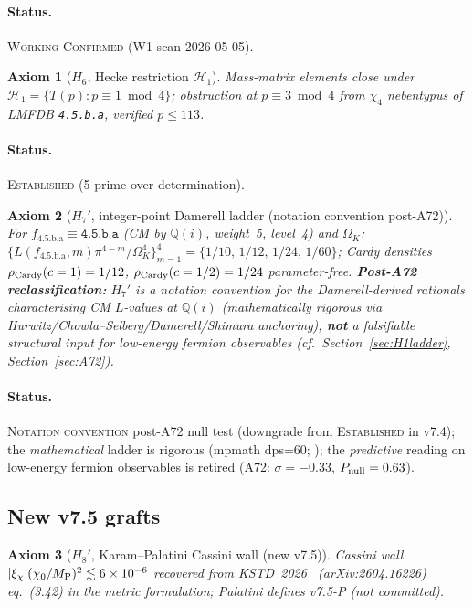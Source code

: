 \documentclass[a4paper,11pt]{article}
\newcommand{\OmK}{\Omega_K}
\newcommand{\fLM}{f_{\text{4.5.b.a}}}
\newcommand{\Qi}{\mathbb{Q}(i)}
\newtheorem*{axiom*}{Axiom}
\theoremstyle{definition}
\theoremstyle{remark}
\begin{document}
\paragraph{Status.}  \textsc{Working-Confirmed} (W1 scan 2026-05-05).

\begin{axiom*}[$H_6$, Hecke restriction $\mathcal{H}_1$]
Mass-matrix elements close under
$\mathcal{H}_1=\{T(p):p\equiv 1\bmod 4\}$; obstruction at
$p\equiv 3\bmod 4$ from $\chi_4$ nebentypus of LMFDB \texttt{4.5.b.a},
verified $p\le 113$.
\end{axiom*}

\paragraph{Status.}  \textsc{Established} (5-prime over-determination).

\begin{axiom*}[$H_7'$, integer-point Damerell ladder (notation convention post-A72)]
For $\fLM\equiv\texttt{4.5.b.a}$ (CM by $\Qi$, weight~5, level~4)
and $\OmK$:
$\bigl\{L(\fLM,m)\pi^{4-m}/\OmK^4\bigr\}_{m=1}^4
=\{1/10,\,1/12,\,1/24,\,1/60\}$; Cardy densities
$\rho_{\rm Cardy}(c=1)=1/12$, $\rho_{\rm Cardy}(c=1/2)=1/24$
parameter-free.
\textbf{Post-A72 reclassification:} $H_7'$ is a \emph{notation
convention} for the Damerell-derived rationals characterising CM
$L$-values at $\Qi$ (mathematically rigorous via
Hurwitz/Chowla--Selberg/Damerell/Shimura anchoring), \textbf{not} a
falsifiable structural input for low-energy fermion observables
(cf.\ Section~\ref{sec:H1ladder}, Section~\ref{sec:A72}).
\end{axiom*}

\paragraph{Status.}  \textsc{Notation convention} post-A72 null
test (downgrade from \textsc{Established} in v7.4); the
\emph{mathematical} ladder is rigorous (mpmath dps=60;
\cite{Hurwitz1899,ChowSel49,Damerell71,Shimura76,HS86}); the
\emph{predictive} reading on low-energy fermion observables is
retired (A72: $\sigma=-0.33$, $P_{\rm null}=0.63$).

\subsection{New v7.5 grafts}
\label{sec:axioms-v75-grafts}

\begin{axiom*}[$H_8'$, Karam--Palatini Cassini wall (new v7.5)]
Cassini wall $|\xi_\chi|(\chi_0/M_{\rm P})^2\lesssim 6\times 10^{-6}$
recovered from KSTD~2026~\cite{KSTD26} (arXiv:2604.16226) eq.~(3.42)
in the metric formulation; Palatini defines v7.5-P (not committed).
\end{axiom*}
\end{document}
